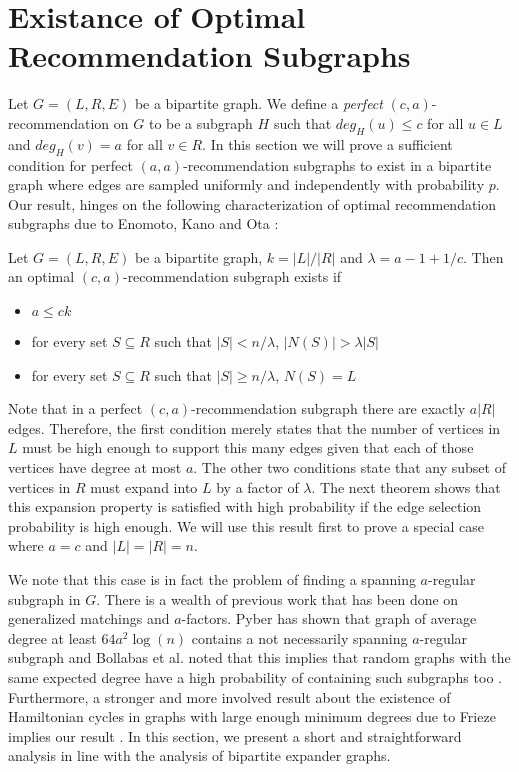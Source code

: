 \section{Existance of Optimal Recommendation Subgraphs}
Let $G=(L,R,E)$ be a bipartite graph. We define a \emph{perfect} $(c,a)$-recommendation on $G$ to be a subgraph $H$ such that $deg_H(u)\leq c$ for all $u\in L$ and $deg_H(v)=a$ for all $v\in R$. In this section we will prove a sufficient condition for perfect $(a,a)$-recommendation subgraphs to exist in a bipartite graph where edges are sampled uniformly and independently with probability $p$. Our result, hinges on the following characterization of optimal recommendation subgraphs due to Enomoto, Kano and Ota \cite{EnomotoKanoOta1988}:

\begin{thm}
Let $G=(L,R,E)$ be a bipartite graph, $k=|L|/|R|$ and $\lambda = a - 1 + 1/c$. Then an optimal $(c,a)$-recommendation subgraph exists if 

\begin{itemize}
\item $a \leq ck$
\item for every set $S\subseteq R$ such that $|S| < n/\lambda$, $|N(S)| > \lambda|S|$
\item for every set $S\subseteq R$ such that $|S| \geq n/\lambda$, $N(S) = L$
\end{itemize}
\end{thm}
 
Note that in a perfect $(c,a)$-recommendation subgraph there are exactly $a|R|$ edges. Therefore, the first condition merely states that the number of vertices in $L$ must be high enough to support this many edges given that each of those vertices have degree at most $a$. The other two conditions state that any subset of vertices in $R$ must expand into $L$ by a factor of $\lambda$. The next theorem shows that this expansion property is satisfied with high probability if the edge selection probability is high enough. We will use this result first to prove a special case where $a=c$ and $|L|=|R|=n$. \vs

We note that this case is in fact the problem of finding a spanning $a$-regular subgraph in $G$. There is a wealth of previous work that has been done on generalized matchings and $a$-factors. Pyber has shown that graph of average degree at least $64a^2\log(n)$ contains a not necessarily spanning $a$-regular subgraph and Bollabas et al. noted that this implies that random graphs with the same expected degree have a high probability of containing such subgraphs too \cite{Bollobas2006, Pyber1985}. Furthermore, a stronger and more involved result about the existence of Hamiltonian cycles in graphs with large enough minimum degrees due to Frieze implies our result \cite{Frieze1988}. In this section, we present a short and straightforward analysis in line with the analysis of bipartite expander graphs.

